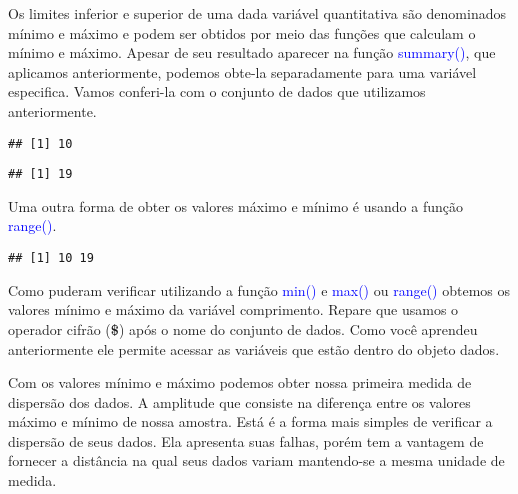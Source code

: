 \documentclass[titlepage, oneside, openany, a4paper]{book}
\newenvironment{Shaded}{\begin{snugshade}}{\end{snugshade}}
\newcommand{\KeywordTok}[1]{\textcolor[rgb]{0.13,0.29,0.53}{\textbf{#1}}}
\newcommand{\NormalTok}[1]{#1}
\newcommand{\OperatorTok}[1]{\textcolor[rgb]{0.81,0.36,0.00}{\textbf{#1}}}
\begin{document}
Os limites inferior e superior de uma dada variável quantitativa são denominados mínimo e máximo e podem ser obtidos por meio das funções que calculam o mínimo e máximo. Apesar de seu resultado aparecer na função \textcolor{blue}{summary()}, que aplicamos anteriormente, podemos obte-la separadamente para uma variável especifica. Vamos conferi-la com o conjunto de dados que utilizamos anteriormente.

\begin{Shaded}
\end{Shaded}

\begin{verbatim}
## [1] 10
\end{verbatim}

\begin{Shaded}
\end{Shaded}

\begin{verbatim}
## [1] 19
\end{verbatim}

Uma outra forma de obter os valores máximo e mínimo é usando a função \textcolor{blue}{range()}.

\begin{Shaded}
\end{Shaded}

\begin{verbatim}
## [1] 10 19
\end{verbatim}

Como puderam verificar utilizando a função \textcolor{blue}{min()} e \textcolor{blue}{max()} ou \textcolor{blue}{range()} obtemos os valores mínimo e máximo da variável comprimento. Repare que usamos o operador cifrão (\textbf{\$}) após o nome do conjunto de dados. Como você aprendeu anteriormente ele permite acessar as variáveis que estão dentro do objeto dados.

Com os valores mínimo e máximo podemos obter nossa primeira medida de dispersão dos dados. A amplitude que consiste na diferença entre os valores máximo e mínimo de nossa amostra. Está é a forma mais simples de verificar a dispersão de seus dados. Ela apresenta suas falhas, porém tem a vantagem de fornecer a distância na qual seus dados variam mantendo-se a mesma unidade de medida.
\end{document}

